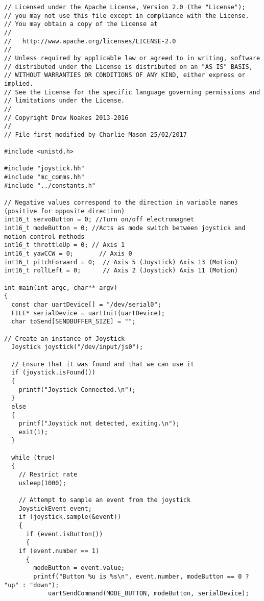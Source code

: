 \documentclass[a4paper,11pt]{article}
\begin{document}
\linespread{0.8}
\begin{lstlisting}
// Licensed under the Apache License, Version 2.0 (the "License");
// you may not use this file except in compliance with the License.
// You may obtain a copy of the License at
//
//   http://www.apache.org/licenses/LICENSE-2.0
//
// Unless required by applicable law or agreed to in writing, software
// distributed under the License is distributed on an "AS IS" BASIS,
// WITHOUT WARRANTIES OR CONDITIONS OF ANY KIND, either express or implied.
// See the License for the specific language governing permissions and
// limitations under the License.
//
// Copyright Drew Noakes 2013-2016
//
// File first modified by Charlie Mason 25/02/2017

#include <unistd.h>

#include "joystick.hh"
#include "mc_comms.hh"
#include "../constants.h"

// Negative values correspond to the direction in variable names (positive for opposite direction)
int16_t servoButton = 0; //Turn on/off electromagnet
int16_t modeButton = 0; //Acts as mode switch between joystick and motion control methods
int16_t throttleUp = 0; // Axis 1
int16_t yawCCW = 0;       // Axis 0
int16_t pitchForward = 0;  // Axis 5 (Joystick) Axis 13 (Motion)
int16_t rollLeft = 0;      // Axis 2 (Joystick) Axis 11 (Motion)

int main(int argc, char** argv)
{
  const char uartDevice[] = "/dev/serial0";
  FILE* serialDevice = uartInit(uartDevice);
  char toSend[SENDBUFFER_SIZE] = "";

// Create an instance of Joystick
  Joystick joystick("/dev/input/js0");

  // Ensure that it was found and that we can use it
  if (joystick.isFound())
  {
    printf("Joystick Connected.\n");
  }
  else
  {
    printf("Joystick not detected, exiting.\n");
    exit(1);
  }

  while (true)
  {
    // Restrict rate
    usleep(1000);

    // Attempt to sample an event from the joystick
    JoystickEvent event;
    if (joystick.sample(&event))
    {
      if (event.isButton())
      {
	if (event.number == 1)
	  {
	    modeButton = event.value;
	    printf("Button %u is %s\n", event.number, modeButton == 0 ? "up" : "down");
            uartSendCommand(MODE_BUTTON, modeButton, serialDevice);


\end{lstlisting}
\end{document}
